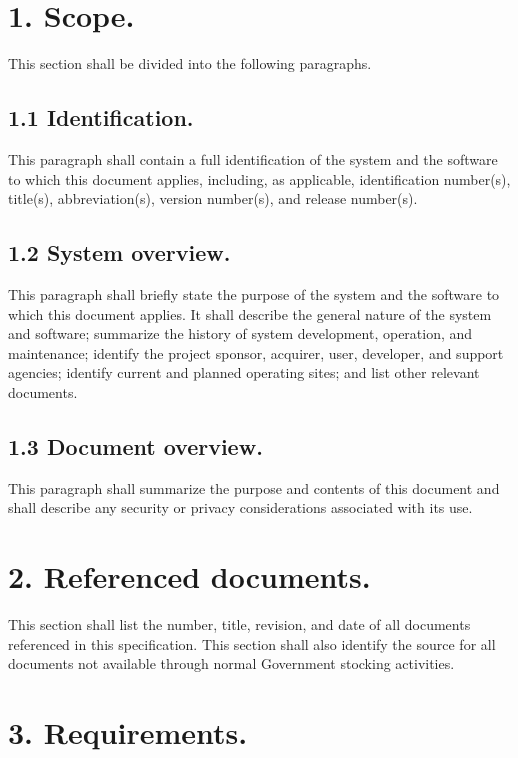 \section{1. Scope.}

This section shall be divided into the following paragraphs.

\subsection{1.1 Identification.}

This paragraph shall contain a full identification of the system and the
software to which this document applies, including, as applicable,
identification number(s), title(s), abbreviation(s), version number(s),
and release number(s).

\subsection{1.2 System overview.}

This paragraph shall briefly state the purpose of the system and the
software to which this document applies. It shall describe the general
nature of the system and software; summarize the history of system
development, operation, and maintenance; identify the project sponsor,
acquirer, user, developer, and support agencies; identify current and
planned operating sites; and list other relevant documents.

\subsection{1.3 Document overview.}

This paragraph shall summarize the purpose and contents of this document
and shall describe any security or privacy considerations associated
with its use.

\section{2. Referenced documents.}

This section shall list the number, title, revision, and date of all
documents referenced in this specification. This section shall also
identify the source for all documents not available through normal
Government stocking activities.

\section{3. Requirements.}

